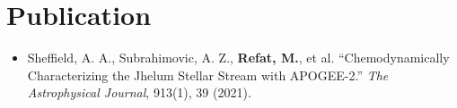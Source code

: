 \section{Publication}
\begin{itemize}[leftmargin=0.15in,label={},topsep=3pt]
  \small
  \item Sheffield, A. A., Subrahimovic, A. Z., \textbf{Refat, M.}, et al.
  ``Chemodynamically Characterizing the Jhelum Stellar Stream with APOGEE-2.''
  \textit{The Astrophysical Journal}, 913(1), 39 (2021).
\end{itemize}
